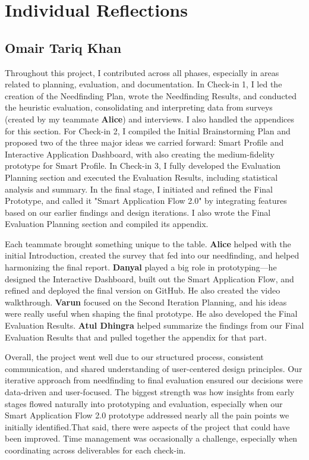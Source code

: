 \documentclass[
	letterpaper, %
]{jdf}
\begin{document}
\begin{sloppypar}
\section{Individual Reflections}
\subsection{Omair Tariq Khan}

Throughout this project, I contributed across all phases, especially in areas related to planning, evaluation, and documentation. In Check-in 1, I led the creation of the Needfinding Plan, wrote the Needfinding Results, and conducted the heuristic evaluation, consolidating and interpreting data from surveys (created by my teammate \textbf{Alice}) and interviews. I also handled the appendices for this section. For Check-in 2, I compiled the Initial Brainstorming Plan and proposed two of the three major ideas we carried forward: Smart Profile and Interactive Application Dashboard, with also creating the medium-fidelity prototype for Smart Profile. In Check-in 3, I fully developed the Evaluation Planning section and executed the Evaluation Results, including statistical analysis and summary. In the final stage, I initiated and refined the Final Prototype, and called it "Smart Application Flow 2.0" by integrating features based on our earlier findings and design iterations. I also wrote the Final Evaluation Planning section and compiled its appendix.

Each teammate brought something unique to the table. \textbf{Alice} helped with the initial Introduction, created the survey that fed into our needfinding, and helped harmonizing the final report. \textbf{Danyal} played a big role in prototyping—he designed the Interactive Dashboard, built out the Smart Application Flow, and refined and deployed the final version on GitHub. He also created the video walkthrough. \textbf{Varun} focused on the Second Iteration Planning, and his ideas were really useful when shaping the final prototype. He also developed the Final Evaluation Results. \textbf{Atul Dhingra} helped summarize the findings from our Final Evaluation Results that and pulled together the appendix for that part. 

Overall, the project went well due to our structured process, consistent communication, and shared understanding of user-centered design principles. Our iterative approach from needfinding to final evaluation ensured our decisions were data-driven and user-focused. The biggest strength was how insights from early stages flowed naturally into prototyping and evaluation, especially when our Smart Application Flow 2.0 prototype addressed nearly all the pain points we initially identified.That said, there were aspects of the project that could have been improved. Time management was occasionally a challenge, especially when coordinating across deliverables for each check-in.


\end{sloppypar}
\end{document}
